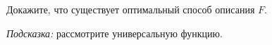 Докажите, что существует оптимальный способ описания $F$.

\textit{Подсказка:} рассмотрите универсальную функцию.